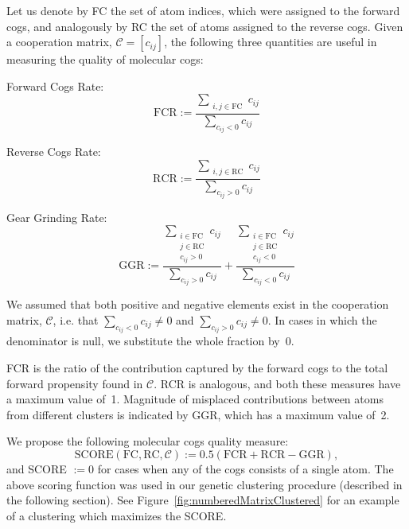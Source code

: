 \documentclass[a4paper,11pt,twoside]{book}%
\begin{document}
Let us denote by FC the set of atom indices, which were assigned to the forward cogs, and analogously by RC the set of atoms assigned to the reverse cogs.
Given a cooperation matrix, $\mathcal{C}=[c_{ij}]$, the following three quantities are useful in measuring the quality of molecular cogs:
\begin{packeditemize}
 \item Forward Cogs Rate: \begin{equation} \text{FCR}:= \frac{\sum_{\substack{i,j\in\text{FC}}}c_{ij}}{\sum_{c_{ij}<0}c_{ij}} \end{equation}
 \item Reverse Cogs Rate: \begin{equation} \text{RCR}:= \frac{\sum_{\substack{i,j\in\text{RC}}}c_{ij}}{\sum_{c_{ij}>0}c_{ij}} \end{equation}
 \item Gear Grinding Rate: \begin{equation} \text{GGR}:=\frac{\sum_{\substack{i\in\text{FC}\\ j\in\text{RC}\\ c_{ij}>0}} c_{ij}}{\sum_{c_{ij}>0}c_{ij}} +  \frac{\sum_{\substack{i\in\text{FC}\\ j\in\text{RC}\\ c_{ij}<0}} c_{ij}}{\sum_{c_{ij}<0}c_{ij}} \end{equation}
\end{packeditemize}
We assumed that both positive and negative elements exist in the cooperation matrix, $\mathcal{C}$, i.e. that $\sum_{c_{ij}<0}c_{ij}\neq0$ and $\sum_{c_{ij}>0}c_{ij}\neq0$.
In cases in which the denominator is null, we substitute the whole fraction by~0.

FCR is the ratio of the contribution captured by the forward cogs to the total forward propensity found in $\mathcal{C}$.
RCR is analogous, and both these measures have a maximum value of~1.
Magnitude of misplaced contributions between atoms from different clusters is indicated by GGR, which has a maximum value of~2.

We propose the following molecular cogs quality measure:
\begin{equation}\label{eq:score}
\text{SCORE}(\text{FC},\text{RC}, \mathcal{C}):= 0.5(\text{FCR}+\text{RCR}-\text{GGR}),
\end{equation}
and SCORE $:=0$ for cases when any of the cogs consists of a single atom. 
The above scoring function was used in our genetic clustering procedure (described in the following section).
{\color{black}See Figure~\ref{fig:numberedMatrixClustered} for an example of a clustering which maximizes the SCORE.}
\end{document}
